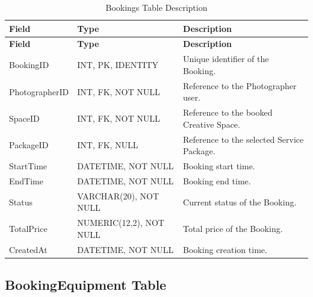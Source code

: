 \begin{longtable}{
		|>{\raggedright\arraybackslash}p{3.2cm}|
		>{\raggedright\arraybackslash}p{4.2cm}|
		>{\raggedright\arraybackslash}p{5.0cm}|
	}
	\caption{Bookings Table Description}
	\label{tab:bookings}\\
	\hline
	\textbf{Field} & \textbf{Type} & \textbf{Description} \\ \hline
	\endfirsthead
	\hline
	\textbf{Field} & \textbf{Type} & \textbf{Description} \\ \hline
	\endhead
	
	BookingID & INT, PK, IDENTITY &
	Unique identifier of the Booking. \\ \hline
	
	PhotographerID & INT, FK, NOT NULL &
	Reference to the Photographer user. \\ \hline
	
	SpaceID & INT, FK, NOT NULL &
	Reference to the booked Creative Space. \\ \hline
	
	PackageID & INT, FK, NULL &
	Reference to the selected Service Package. \\ \hline
	
	StartTime & DATETIME, NOT NULL &
	Booking start time. \\ \hline
	
	EndTime & DATETIME, NOT NULL &
	Booking end time. \\ \hline
	
	Status & VARCHAR(20), NOT NULL &
	Current status of the Booking. \\ \hline
	
	TotalPrice & NUMERIC(12,2), NOT NULL &
	Total price of the Booking. \\ \hline
	
	CreatedAt & DATETIME, NOT NULL &
	Booking creation time. \\ \hline
	
\end{longtable}


\subsection{BookingEquipment Table}

